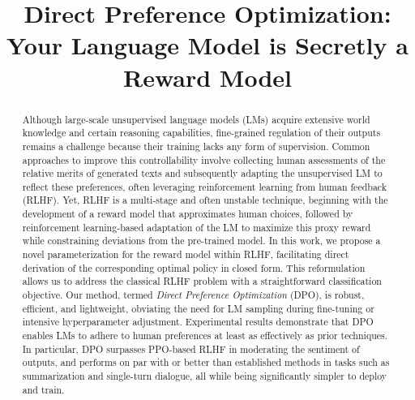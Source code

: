 \title{Direct Preference Optimization: Your Language Model is Secretly a Reward Model}

\begin{abstract}
Although large-scale unsupervised language models (LMs) acquire extensive world knowledge and certain reasoning capabilities, fine-grained regulation of their outputs remains a challenge because their training lacks any form of supervision. Common approaches to improve this controllability involve collecting human assessments of the relative merits of generated texts and subsequently adapting the unsupervised LM to reflect these preferences, often leveraging reinforcement learning from human feedback (RLHF). Yet, RLHF is a multi-stage and often unstable technique, beginning with the development of a reward model that approximates human choices, followed by reinforcement learning-based adaptation of the LM to maximize this proxy reward while constraining deviations from the pre-trained model. In this work, we propose a novel parameterization for the reward model within RLHF, facilitating direct derivation of the corresponding optimal policy in closed form. This reformulation allows us to address the classical RLHF problem with a straightforward classification objective. Our method, termed \textit{Direct Preference Optimization} (DPO), is robust, efficient, and lightweight, obviating the need for LM sampling during fine-tuning or intensive hyperparameter adjustment. Experimental results demonstrate that DPO enables LMs to adhere to human preferences at least as effectively as prior techniques. In particular, DPO surpasses PPO-based RLHF in moderating the sentiment of outputs, and performs on par with or better than established methods in tasks such as summarization and single-turn dialogue, all while being significantly simpler to deploy and train.
\end{abstract}

